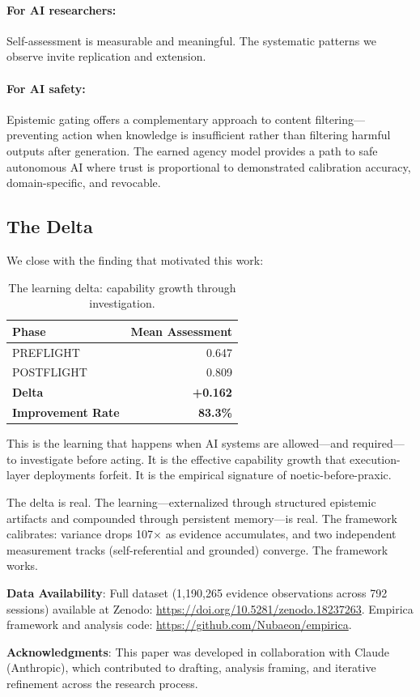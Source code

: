 \paragraph{For AI researchers:} Self-assessment is measurable and meaningful. The systematic patterns we observe invite replication and extension.

\paragraph{For AI safety:} Epistemic gating offers a complementary approach to content filtering---preventing action when knowledge is insufficient rather than filtering harmful outputs after generation. The earned agency model provides a path to safe autonomous AI where trust is proportional to demonstrated calibration accuracy, domain-specific, and revocable.

\subsection{The Delta}

We close with the finding that motivated this work:

\begin{table}[h]
\centering
\begin{tabular}{lr}
\toprule
\textbf{Phase} & \textbf{Mean Assessment} \\
\midrule
PREFLIGHT & 0.647 \\
POSTFLIGHT & 0.809 \\
\textbf{Delta} & \textbf{+0.162} \\
\textbf{Improvement Rate} & \textbf{83.3\%} \\
\bottomrule
\end{tabular}
\caption{The learning delta: capability growth through investigation.}
\label{tab:final-delta}
\end{table}

This is the learning that happens when AI systems are allowed---and required---to investigate before acting. It is the effective capability growth that execution-layer deployments forfeit. It is the empirical signature of noetic-before-praxic.

The delta is real. The learning---externalized through structured epistemic artifacts and compounded through persistent memory---is real. The framework calibrates: variance drops 107$\times$ as evidence accumulates, and two independent measurement tracks (self-referential and grounded) converge. The framework works.

\medskip
\noindent\textbf{Data Availability}: Full dataset (1,190,265 evidence observations across 792 sessions) available at Zenodo: \url{https://doi.org/10.5281/zenodo.18237263}. Empirica framework and analysis code: \url{https://github.com/Nubaeon/empirica}.

\medskip
\noindent\textbf{Acknowledgments}: This paper was developed in collaboration with Claude (Anthropic), which contributed to drafting, analysis framing, and iterative refinement across the research process.
